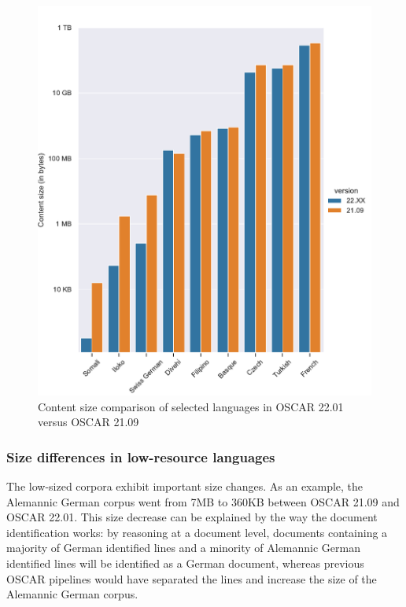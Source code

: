 \begin{figure}[!ht]
    \begin{center}
        \includegraphics[width=\linewidth]{static/media/oscar/towards/size_comp_content}
        \caption{Content size comparison of selected languages in OSCAR 22.01 versus OSCAR 21.09}
        \label{fig.2}
    \end{center}
\end{figure}

\subsubsection{Size differences in low-resource languages}

The low-sized corpora exhibit important size changes. As an example, the Alemannic German corpus went from 7MB to 360KB between OSCAR 21.09 and OSCAR 22.01. This size decrease can be explained by the way the document identification works: by reasoning at a document level, documents containing a majority of German identified lines and a minority of Alemannic German identified lines will be identified as a German document, whereas previous OSCAR pipelines would have separated the lines and increase the size of the Alemannic German corpus.

